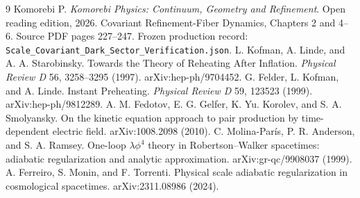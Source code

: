 \documentclass[11pt]{article}
\theoremstyle{definition}\newtheorem{definition}[theorem]{Definition}
\begin{document}
\begin{thebibliography}{9}\small
{} Komorebi P. \emph{Komorebi Physics: Continuum, Geometry and Refinement}. Open reading edition, 2026. Covariant Refinement-Fiber Dynamics, Chapters 2 and 4--6. Source PDF pages 227--247. Frozen production record: \texttt{Scale\_Covariant\_Dark\_Sector\_Verification.json}.
 L. Kofman, A. Linde, and A. A. Starobinsky. Towards the Theory of Reheating After Inflation. \emph{Physical Review D} 56, 3258--3295 (1997). arXiv:hep-ph/9704452.
 G. Felder, L. Kofman, and A. Linde. Instant Preheating. \emph{Physical Review D} 59, 123523 (1999). arXiv:hep-ph/9812289.
 A. M. Fedotov, E. G. Gelfer, K. Yu. Korolev, and S. A. Smolyansky. On the kinetic equation approach to pair production by time-dependent electric field. arXiv:1008.2098 (2010).
 C. Molina-Par\'is, P. R. Anderson, and S. A. Ramsey. One-loop $\lambda\phi^4$ theory in Robertson--Walker spacetimes: adiabatic regularization and analytic approximation. arXiv:gr-qc/9908037 (1999).
 A. Ferreiro, S. Monin, and F. Torrenti. Physical scale adiabatic regularization in cosmological spacetimes. arXiv:2311.08986 (2024).
\end{thebibliography}
\end{document}
